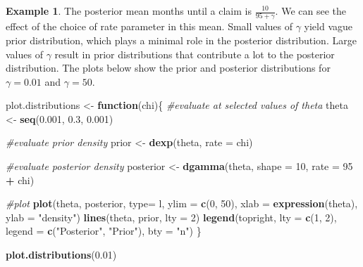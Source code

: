 \documentclass[
]{book}
\newenvironment{Shaded}{\begin{snugshade}}{\end{snugshade}}
\newcommand{\AttributeTok}[1]{\textcolor[rgb]{0.13,0.29,0.53}{#1}}
\newcommand{\CommentTok}[1]{\textcolor[rgb]{0.56,0.35,0.01}{\textit{#1}}}
\newcommand{\ControlFlowTok}[1]{\textcolor[rgb]{0.13,0.29,0.53}{\textbf{#1}}}
\newcommand{\DecValTok}[1]{\textcolor[rgb]{0.00,0.00,0.81}{#1}}
\newcommand{\FloatTok}[1]{\textcolor[rgb]{0.00,0.00,0.81}{#1}}
\newcommand{\FunctionTok}[1]{\textcolor[rgb]{0.13,0.29,0.53}{\textbf{#1}}}
\newcommand{\NormalTok}[1]{#1}
\newcommand{\OtherTok}[1]{\textcolor[rgb]{0.56,0.35,0.01}{#1}}
\newcommand{\SpecialCharTok}[1]{\textcolor[rgb]{0.81,0.36,0.00}{\textbf{#1}}}
\newcommand{\StringTok}[1]{\textcolor[rgb]{0.31,0.60,0.02}{#1}}
\theoremstyle{definition}
\theoremstyle{definition}
\newtheorem{example}{Example}[chapter]
\theoremstyle{definition}
\theoremstyle{definition}
\theoremstyle{remark}
\begin{document}
\begin{example}
The posterior mean months until a claim is \(\frac{10}{95 + \gamma}\). We can see the effect of the choice of rate parameter in this mean. Small values of \(\gamma\) yield vague prior distribution, which plays a minimal role in the posterior distribution. Large values of \(\gamma\) result in prior distributions that contribute a lot to the posterior distribution. The plots below show the prior and posterior distributions for \(\gamma = 0.01\) and \(\gamma = 50\).

\begin{Shaded}
\begin{Highlighting}[]
\NormalTok{plot.distributions }\OtherTok{\textless{}{-}} \ControlFlowTok{function}\NormalTok{(chi)\{}
  \CommentTok{\#evaluate at selected values of theta}
\NormalTok{  theta }\OtherTok{\textless{}{-}} \FunctionTok{seq}\NormalTok{(}\FloatTok{0.001}\NormalTok{, }\FloatTok{0.3}\NormalTok{, }\FloatTok{0.001}\NormalTok{) }
  
  \CommentTok{\#evaluate prior density}
\NormalTok{  prior }\OtherTok{\textless{}{-}} \FunctionTok{dexp}\NormalTok{(theta, }\AttributeTok{rate =}\NormalTok{ chi)}
  
  \CommentTok{\#evaluate posterior density}
\NormalTok{  posterior }\OtherTok{\textless{}{-}} \FunctionTok{dgamma}\NormalTok{(theta, }\AttributeTok{shape =} \DecValTok{10}\NormalTok{, }\AttributeTok{rate =} \DecValTok{95} \SpecialCharTok{+}\NormalTok{ chi)}
  
  
  \CommentTok{\#plot}
  \FunctionTok{plot}\NormalTok{(theta, posterior, }\AttributeTok{type=} \StringTok{\textquotesingle{}l\textquotesingle{}}\NormalTok{, }
       \AttributeTok{ylim =} \FunctionTok{c}\NormalTok{(}\DecValTok{0}\NormalTok{, }\DecValTok{50}\NormalTok{), }\AttributeTok{xlab =} \FunctionTok{expression}\NormalTok{(theta), }\AttributeTok{ylab =} \StringTok{"density"}\NormalTok{)}
  \FunctionTok{lines}\NormalTok{(theta, prior, }\AttributeTok{lty =} \DecValTok{2}\NormalTok{)}
  \FunctionTok{legend}\NormalTok{(}\StringTok{\textquotesingle{}topright\textquotesingle{}}\NormalTok{, }\AttributeTok{lty =} \FunctionTok{c}\NormalTok{(}\DecValTok{1}\NormalTok{, }\DecValTok{2}\NormalTok{), }\AttributeTok{legend =} \FunctionTok{c}\NormalTok{(}\StringTok{"Posterior"}\NormalTok{, }\StringTok{"Prior"}\NormalTok{),  }
         \AttributeTok{bty =} \StringTok{"n"}\NormalTok{)}
\NormalTok{\}}

\FunctionTok{plot.distributions}\NormalTok{(}\FloatTok{0.01}\NormalTok{)}
\end{Highlighting}
\end{Shaded}


\end{example}
\end{document}
